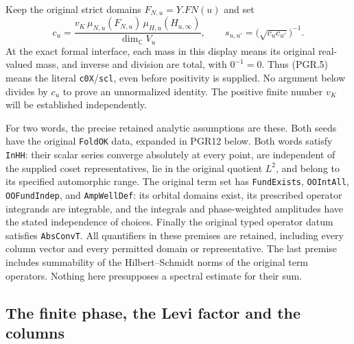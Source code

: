 \documentclass[11pt,a4paper]{article}
\numberwithin{equation}{section}
\theoremstyle{remark}\newtheorem{remark}[theorem]{Remark}
\begin{document}
Keep the original strict domains \(F_{N,u}=Y.FN(u)\) and set
\[
 c_u=\frac{v_K\,\mu_{N,u}(F_{N,u})\,\mu_{H,u}(H_{u,\infty})}
                 {\dim_{\mathbb C}V_u},\qquad
 s_{u,u'}=\bigl(\sqrt{c_uc_{u'}}\bigr)^{-1}.
\tag{PGR.5}
\]
At the exact formal interface, each mass in this display means its
original real-valued mass, and inverse and division are total, with
\(0^{-1}=0\).  Thus (PGR.5) means the literal
\texttt{c0X}/\texttt{scl}, even before positivity is supplied.
No argument below divides by \(c_u\) to prove an unnormalized identity.
The positive finite number \(v_K\) will be established independently.

For two words, the precise retained analytic assumptions are these.
Both seeds have the original \texttt{Fold\allowbreak OK} data, expanded in
PGR12 below.  Both words satisfy \texttt{In\allowbreak HH}: their scalar series
converge absolutely at every point, are independent of the supplied
coset representatives, lie in the original quotient \(L^2\), and
belong to its specified automorphic range.  The original term set has
\texttt{Fund\allowbreak Exists}, \texttt{OOInt\allowbreak All}, \texttt{OOFund\allowbreak Indep}, and
\texttt{Amp\allowbreak Well\allowbreak Def}: its orbital domains exist, its prescribed
operator integrands are integrable, and the integrals and
phase-weighted amplitudes have the stated independence of choices.
Finally the original typed operator datum satisfies \texttt{Abs\allowbreak Conv\allowbreak T}.
All quantifiers in these premises are retained, including every column
vector and every permitted domain or representative.  The last premise
includes summability of the Hilbert--Schmidt norms of the original term
operators.  Nothing here presupposes a spectral estimate for their sum.

\subsection{The finite phase, the Levi factor and the columns}

\end{document}
